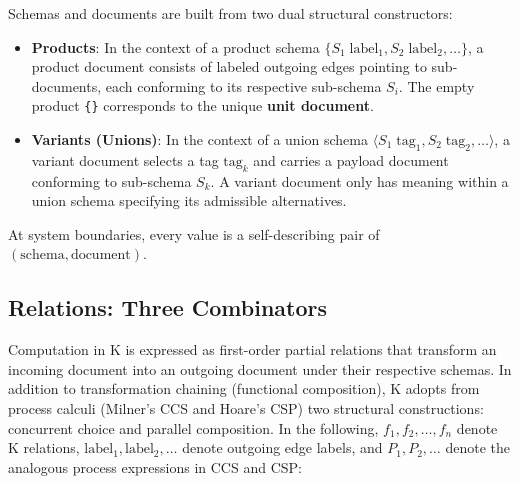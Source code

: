 \documentclass[11pt,a4paper]{article}
\begin{document}
Schemas and documents are built from two dual structural constructors:
\begin{itemize}
  \item \textbf{Products}: In the context of a product schema $\{ S_1 \;\text{label}_1, S_2 \;\text{label}_2, \dots \}$, a product document consists of labeled outgoing edges pointing to sub-documents, each conforming to its respective sub-schema $S_i$. The empty product \lstinline|{}| corresponds to the unique \textbf{unit document}.
  \item \textbf{Variants (Unions)}: In the context of a union schema $\langle S_1 \;\text{tag}_1, S_2 \;\text{tag}_2, \dots \rangle$, a variant document selects a tag $\text{tag}_k$ and carries a payload document conforming to sub-schema $S_k$. A variant document only has meaning within a union schema specifying its admissible alternatives.
\end{itemize}

At system boundaries, every value is a self-describing pair of $(\text{schema}, \text{document})$.

\subsection{Relations: Three Combinators}

Computation in K is expressed as first-order partial relations that transform an incoming document into an outgoing document under their respective schemas. In addition to transformation chaining (functional composition), K adopts from process calculi (Milner's CCS and Hoare's CSP) two structural constructions: concurrent choice and parallel composition. In the following, $f_1, f_2, \dots, f_n$ denote K relations, $\text{label}_1, \text{label}_2, \dots$ denote outgoing edge labels, and $P_1, P_2, \dots$ denote the analogous process expressions in CCS and CSP:
\end{document}
